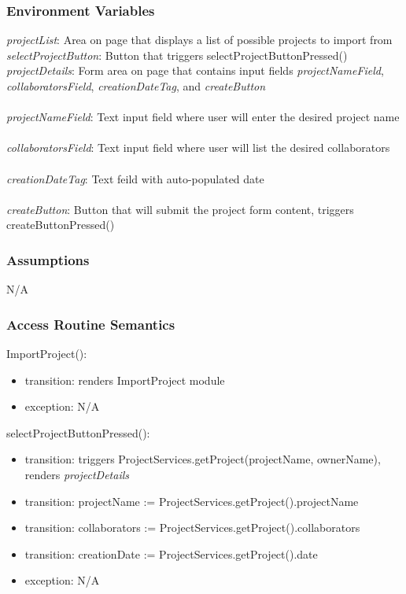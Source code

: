 \documentclass[12pt, titlepage]{article}
\begin{document}
	\subsubsection{Environment Variables}
	\textit{projectList}: Area on page that displays a list of possible projects to import from
	\textit{selectProjectButton}: Button that triggers selectProjectButtonPressed()
	\textit{projectDetails}: Form area on page that contains input fields \textit{projectNameField}, \textit{collaboratorsField}, \textit{creationDateTag}, and \textit{createButton}\\\\
	\textit{projectNameField}: Text input field where user will enter the desired project name\\\\ 
	\textit{collaboratorsField}: Text input field where user will list the desired collaborators\\\\
	\textit{creationDateTag}: Text feild with auto-populated date \\\\
	\textit{createButton}: Button that will submit the project form content, triggers createButtonPressed()
	
	\subsubsection{Assumptions}
	N/A
	
	\subsubsection{Access Routine Semantics}
	
	\noindent ImportProject():
	\begin{itemize}
		\item transition: renders ImportProject module
		\item exception: N/A
	\end{itemize}
	
	\noindent selectProjectButtonPressed():
	\begin{itemize}
		\item transition: triggers ProjectServices.getProject(projectName, ownerName), renders \textit{projectDetails}
		\item transition: projectName := ProjectServices.getProject().projectName
		\item transition: collaborators := ProjectServices.getProject().collaborators
		\item transition: creationDate := ProjectServices.getProject().date
		\item exception: N/A
	\end{itemize}
	
\end{document}
